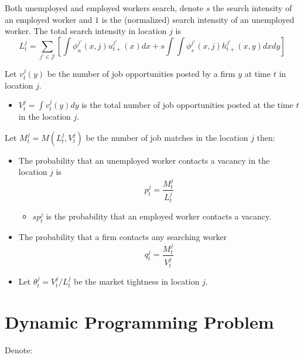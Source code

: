 \documentclass[
  letterpaper,
  DIV=11,
  numbers=noendperiod]{scrreprt}
\providecommand{\tightlist}{%
  \setlength{\itemsep}{0pt}\setlength{\parskip}{0pt}}\usepackage{longtable,booktabs,array}
\begin{document}
Both unemployed and employed workers search, denote \(s\) the search
intensity of an employed worker and \(1\) is the (normalized) search
intensity of an unemployed worker. The total search intensity in
location \(j\) is
\[L^j_t = \sum_{j'\in\mathcal{J}}\left[\int \phi_u^{j'}(x,j)u^{j'}_{t+}(x) dx + s\int\int \phi_s^{j'}(x,j)h^{j'}_{t+}(x,y)dx dy\right]\]

Let \(v^j_t(y)\) be the number of job opportunities posted by a firm
\(y\) at time \(t\) in location \(j\).

\begin{itemize}
\tightlist
\item
  \(V^j_t = \int v^j_t(y) dy\) is the total number of job opportunities
  posted at the time \(t\) in the location \(j\).
\end{itemize}

Let \(M^j_t = M(L^j_t, V^j_t)\) be the number of job matches in the
location \(j\) then:

\begin{itemize}
\tightlist
\item
  The probability that an unemployed worker contacts a vacancy in the
  location \(j\) is \[p^j_t = \frac{M^j_t}{L^j_t}\]

  \begin{itemize}
  \tightlist
  \item
    \(sp^j_t\) is the probability that an employed worker contacts a
    vacancy.
  \end{itemize}
\item
  The probability that a ﬁrm contacts any searching worker
  \[q^j_t = \frac{M^j_t}{V^j_t}\]
\item
  Let \(\theta_t^j = V^j_t / L^j_t\) be the market tightness in location
  \(j\).
\end{itemize}

\hypertarget{dynamic-programming-problem}{%
\section{Dynamic Programming
Problem}\label{dynamic-programming-problem}}

Denote:
\end{document}
